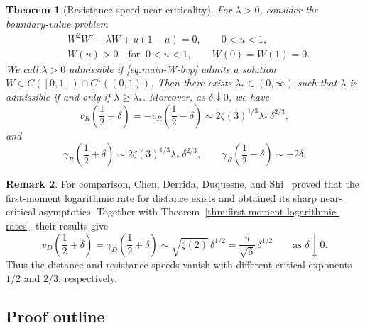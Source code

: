 \documentclass[12pt]{amsart}
\numberwithin{equation}{section}
\theoremstyle{plain}
\newtheorem{theorem}{Theorem}[section]
\theoremstyle{definition}
\newtheorem{remark}[theorem]{Remark}
\begin{document}
\begin{theorem}[Resistance speed near criticality]
\label{thm:near-critical-speed}
For $\lambda>0$, consider the boundary-value problem
\begin{equation}
\begin{aligned}
 &W^2W'-\lambda W+u(1-u)=0,\qquad 0<u<1,\\
 &W(u)>0\quad\text{for }\ 0<u<1, \qquad
 W(0)=W(1)=0.
\end{aligned}
 \label{eq:main-W-bvp}
\end{equation}
We call $\lambda>0$ \emph{admissible} if \eqref{eq:main-W-bvp} admits a solution
$W\in C([0,1])\cap C^1((0,1))$.
Then there exists $\lambda_*\in(0,\infty)$ such that $\lambda$ is admissible
if and only if $\lambda\ge\lambda_*$.   Moreover, as
$\delta\downarrow0$, we have
\begin{equation}
 v_R\left(\frac12+\delta\right)
 =-v_R\left(\frac12-\delta\right)
 \sim2\zeta(3)^{1/3}\lambda_*\,\delta^{2/3},
 \label{eq:main-near-critical-limit}
\end{equation}
and
\begin{equation}
 \gamma_R\left(\frac12+\delta\right)
 \sim2\zeta(3)^{1/3}\lambda_*\,\delta^{2/3},
 \qquad
 \gamma_R\left(\frac12-\delta\right)\sim-2\delta.
 \label{eq:resistance-first-moment-near-critical}
\end{equation}
\end{theorem}

\begin{remark}
For comparison, Chen, Derrida, Duquesne, and
Shi~\cite[equation~(1.2) and Theorem~1]{ChenDerridaDuquesneShi2026} proved
that the first-moment logarithmic rate for distance exists and obtained its
sharp
near-critical asymptotics.  Together with
Theorem~\ref{thm:first-moment-logarithmic-rates}, their results give
\begin{equation*}
 v_D\left(\frac12+\delta\right)=\gamma_D\left(\frac12+\delta\right)
 \sim \sqrt{\zeta(2)}\,\delta^{1/2}
 =\frac{\pi}{\sqrt6}\,\delta^{1/2}
 \qquad\text{as }\delta\downarrow0.
\end{equation*}
Thus the distance and resistance speeds vanish with different critical
exponents $1/2$ and $2/3$, respectively.
\end{remark}

\subsection{Proof outline}
\end{document}
